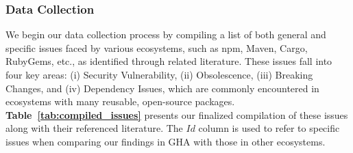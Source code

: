 \documentclass[conference]{IEEEtran}
\begin{document}
            \subsubsection{\textbf{Data Collection}}
            We begin our data collection process by compiling a list of both general and specific issues faced by various ecosystems, such as npm, Maven, Cargo, RubyGems, etc., as identified through related literature. These issues fall into four key areas: (i) Security Vulnerability, (ii) Obsolescence, (iii) Breaking Changes, and (iv) Dependency Issues, which are commonly encountered in ecosystems with many reusable, open-source packages. \textbf{Table~\ref{tab:compiled_issues}} presents our finalized compilation of these issues along with their referenced literature. The $Id$ column is used to refer to specific issues when comparing our findings in GHA with those in other ecosystems.\\
\end{document}
